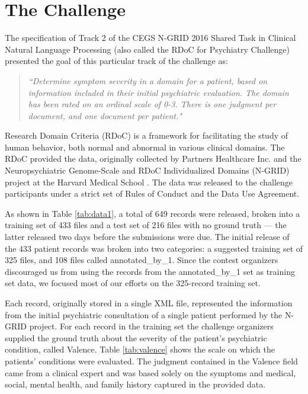 \chapter{The Challenge}\label{sec:challenge}

The specification of Track 2 of the CEGS N-GRID 2016 Shared Task in Clinical Natural Language Processing  (also called the RDoC for Psychiatry Challenge) presented 
the goal of this particular track of the challenge as:
\begin{quote}
\textsl{``Determine symptom severity in a domain for a patient, based on information included in their initial psychiatric evaluation. The domain has been rated on an ordinal scale of 0-3. There is one judgment per document, and one document per patient."}\cite{N-GRID}
\end{quote}

Research Domain Criteria (RDoC) is a framework for facilitating the study of human behavior,
both normal and abnormal in various clinical domains. The RDoC provided the data,
originally collected by Partners Healthcare Inc. and the Neuropsychiatric Genome-Scale and RDoC
Individualized Domains (N-GRID) project at the Harvard Medical School \cite{N-GRID}.  The data
was released to the challenge participants under a strict set of Rules of Conduct and the Data Use Agreement.

As shown in Table \ref{tab:data1}, a total of 649 records were released,  broken into a training set of 433 files and 
a test set of 216 files with no ground truth --- the latter released two days before
the submissions were due. The initial release of the 433 patient records was broken into two categories: a suggested training set of 325 files, and 108 files
called \textsf{annotated\_by\_1}. Since the contest organizers discouraged us from using the records from the \textsf{annotated\_by\_1} set as training set data, we focused 
most of our efforts on the 325-record training set.

Each record, originally stored in a single XML file, represented the information from the
initial psychiatric consultation of a single patient performed by the N-GRID project. 
For each record in the training set the challenge organizers supplied the ground truth
about the severity of the patient's psychiatric condition, called \textsf{Valence}. Table \ref{tab:valence} shows the
scale on which the patients' conditions were evaluated.  The judgment contained in the \textsf{Valence}
field came from a clinical expert and was based solely on the symptoms and medical, social, 
mental health, and family history captured in the provided data.

